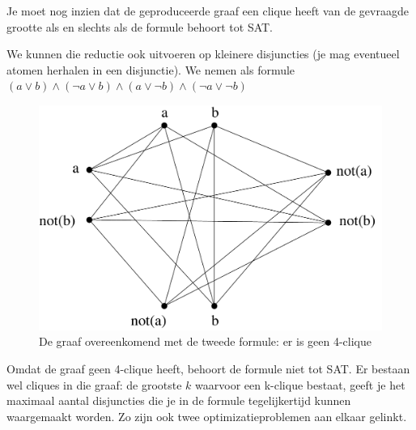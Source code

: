 Je moet nog inzien dat de geproduceerde graaf een clique heeft van de
gevraagde grootte als en slechts als de formule behoort tot SAT.


\begin{vb}
We kunnen die reductie ook uitvoeren op kleinere disjuncties (je
mag eventueel atomen herhalen in een disjunctie). We nemen als formule
$(a \vee b) \wedge (\neg a \vee b) \wedge (a \vee \neg b) \wedge (\neg a \vee \neg b)$


\begin{figure}[h]
\begin{center}
\includegraphics[height=0.2\textheight,keepaspectratio]{satclique2}
\caption{De graaf overeenkomend met de tweede formule: er is geen 4-clique}\label{satclique2}
\end{center}
\end{figure}

Omdat de graaf geen 4-clique heeft, behoort de formule niet tot
SAT. Er bestaan wel cliques in die graaf: de grootste $k$ waarvoor een
k-clique bestaat, geeft je het maximaal aantal disjuncties die je in
de formule tegelijkertijd kunnen waargemaakt worden. Zo zijn ook twee
optimizatieproblemen aan elkaar gelinkt.

\end{vb}

